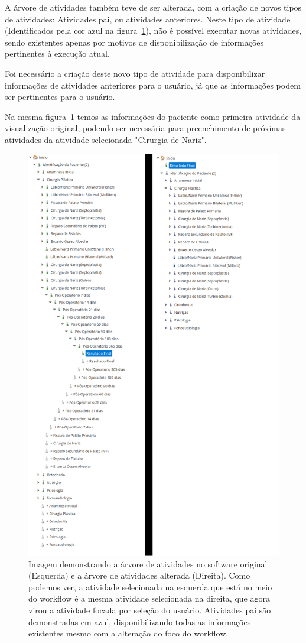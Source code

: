 A árvore de atividades também teve de ser alterada, com a criação de novos tipos de atividades: Atividades pai, ou atividades anteriores. Neste tipo de atividade (Identificados pela cor azul na figura~\ref{fig:centrare_tree_normal_altered}), não é possível executar novas atividades, sendo existentes apenas por motivos de disponibilização de informações pertinentes à execução atual.

Foi necessário a criação deste novo tipo de atividade para disponibilizar informações de atividades anteriores para o usuário, já que as informações podem ser pertinentes para o usuário.

Na mesma figura~\ref{fig:centrare_tree_normal_altered} temos as informações do paciente como primeira atividade da visualização original, podendo ser necessária para preenchimento de próximas atividades da atividade selecionada "Cirurgia de Nariz".

\begin{figure}
    \centering
    \includegraphics[height=1\textwidth]{imgs/CENTRARE/arvoreNormalEAlterada.png}
    \caption{Imagem demonstrando a árvore de atividades no software original (Esquerda) e a árvore de atividades alterada (Direita). Como podemos ver, a atividade selecionada na esquerda que está no meio do workflow é a mesma atividade selecionada na direita, que agora virou a atividade focada por seleção do usuário. Atividades pai são demonstradas em azul, disponibilizando todas as informações existentes mesmo com a alteração do foco do workflow.}
    \label{fig:centrare_tree_normal_altered}
\end{figure}

